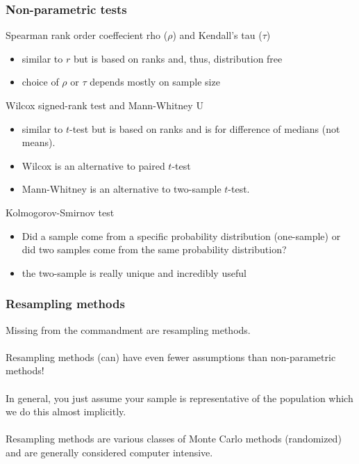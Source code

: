 \documentclass{beamer}
\begin{document}
  \begin{frame}
    \frametitle{Non-parametric tests}
    
    Spearman rank order coeffecient rho (\(\rho\)) and Kendall's tau (\(\tau\))
    \begin{itemize}
      \item similar to \(r\) but is based on ranks and, thus, distribution free
      \item choice of \(\rho\) or \(\tau\) depends mostly on sample size
    \end{itemize}
    Wilcox signed-rank test and Mann-Whitney U
    \begin{itemize}
      \item similar to \(t\)-test but is based on ranks and is for difference of medians (not means). 
      \item Wilcox is an alternative to paired \(t\)-test
      \item Mann-Whitney is an alternative to two-sample \(t\)-test.
    \end{itemize}
    Kolmogorov-Smirnov test
    \begin{itemize}
      \item Did a sample come from a specific probability distribution (one-sample) or did two samples come from the same probability distribution?
      \item the two-sample is really unique and incredibly useful
    \end{itemize}
  \end{frame}
  
  
  
  \begin{frame}
    \frametitle{Resampling methods}
    Missing from the commandment are resampling methods.
    \\~\\
    Resampling methods (can) have even fewer assumptions than non-parametric methods!
    \\~\\
    In general, you just assume your sample is representative of the population which we do this almost implicitly.
    \\~\\
    Resampling methods are various classes of Monte Carlo methods (randomized) and are generally considered computer intensive.
  \end{frame}
  
  
  
\end{document}
